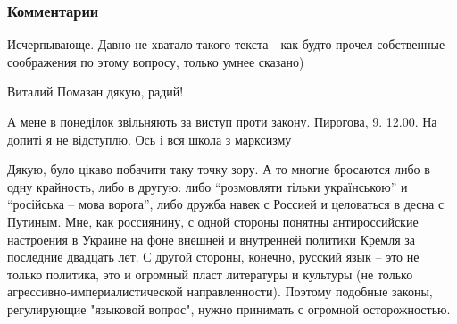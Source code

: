 \subsubsection{Комментарии}


Исчерпывающе. Давно не хватало такого текста - как будто прочел собственные
соображения по этому вопросу, только умнее сказано)


Виталий Помазан дякую, радий!


А мене в понеділок звільняють за виступ проти закону. Пирогова, 9. 12.00. На
допиті я не відступлю. Ось і вся школа з марксизму


Дякую, було цікаво побачити таку точку зору. А то многие бросаются либо в одну
крайность, либо в другую: либо \enquote{розмовляти тільки українською} и \enquote{російська –
мова ворога}, либо дружба навек с Россией и целоваться в десна с Путиным. Мне,
как россиянину, с одной стороны понятны антироссийские настроения в Украине на
фоне внешней и внутренней политики Кремля за последние двадцать лет. С другой
стороны, конечно, русский язык – это не только политика, это и огромный пласт
литературы и культуры (не только агрессивно-империалистической направленности).
Поэтому подобные законы, регулирующие "языковой вопрос", нужно принимать с
огромной осторожностью.

